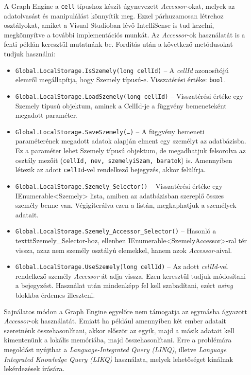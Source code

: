 A Graph Engine a \texttt{cell} típushoz készít úgynevezett \emph{Accessor}-okat, melyek az adatolvasást és manipulálást könnyítik meg. Ezzel párhuzamosan létrehoz osztályokat, amiket a Visual Studioban lévő IntelliSense is tud kezelni, megkönnyítve a további implementációs munkát. Az \emph{Accessor}-ok használatát is a fenti példán keresztül mutatnánk be. Fordítás után a következő metódusokat tudjuk használni: 
\begin{itemize}
	\item \texttt{Global.LocalStorage.IsSzemely(long cellId)} \--- A \emph{cellId} azonosítójú elemről megállapítja, hogy Szemely típusú-e. Visszatérési értéke: \texttt{bool}.
	\item \texttt{Global.LocalStorage.LoadSzemely(long cellId)} \--- Visszatérési értéke egy Szemely típusú objektum, aminek a CellId-je a függvény bemeneteként megadott paraméter.
	\item \texttt{Global.LocalStorage.SaveSzemely(\ldots{})} \--- A függvény bemeneti paraméterének megadott adatok alapján elment egy személyt az adatbázisba. Ez a paraméter lehet Szemely típusú objektum, de megadhatjuk felsorolva az osztály mezőit (\texttt{cellId, nev, szemelyiSzam, baratok}) is. Amennyiben létezik az adott \texttt{cellId}-vel rendelkező bejegyzés, akkor felülírja.
	\item \texttt{Global.LocalStorage.Szemely\_Selector()} \--- Visszatérési értéke egy IEnumerable<Szemely> lista, amiben az adatbázisban szereplő összes személy benne van. Végigiterálva ezen a listán, megkaphatjuk a személyek adatait.
	\item \texttt{Global.LocalStorage.Szemely\_Accessor\_Selector()} \--- Hasonló a texttt{Szemely\_Selector}-hoz, ellenben IEnumerable<SzemelyAccessor>-ral tér vissza, azaz nem személy osztályú elemekkel, hanem azok \emph{Accessor}-aival.
	\item \texttt{Global.LocalStorage.UseSzemely(long cellId)} \--- Az adott \emph{cellId}-vel rendelkező személy \emph{Accessor}-át adja vissza. Ezen keresztül tudjuk módosítani a bejegyzést. Használat után mindenképp fel kell szabadítani, ezért \emph{using} blokkba érdemes illeszteni.
\end{itemize}

Sajnálatos módon a Graph Engine egyelőre nem támogatja az egymásba ágyazott \emph{Accessor}-ok használatát. Emiatt ha például amennyiben két ember adatait szeretnénk összehasonlítani, akkor először az egyik, majd a másik adatait kell kimentenünk a lokális memóriába, majd összehasonlítani. Erre a problémára megoldást nyújthat a \emph{Language-Integrated Query (LINQ)}, illetve \emph{Language Integrated Knowledge Query (LIKQ)} használata, melyek lehetőséget kínálnak lekérdezések írására.

